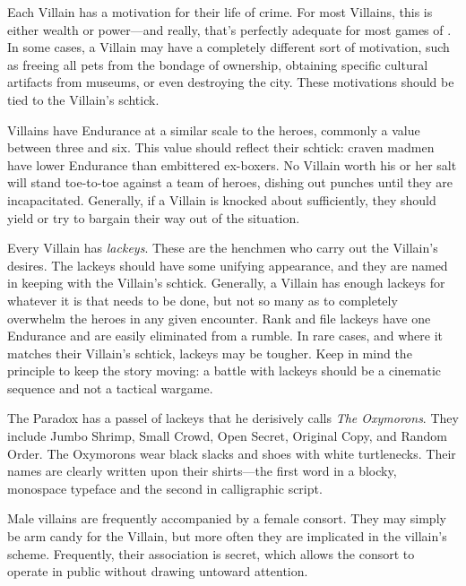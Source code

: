 \documentclass[letterpaper]{report}
\begin{document}
Each Villain has a motivation for their life of crime. For most
Villains, this is either wealth or power---and really, that's
perfectly adequate for most games of \kapow{}. In some cases, a
Villain may have a completely different sort of motivation, such as
freeing all pets from the bondage of ownership, obtaining specific
cultural artifacts from museums, or even destroying the city.  These
motivations should be tied to the Villain's schtick.

Villains have Endurance at a similar scale to the heroes,
commonly a value between three and six.
This value should reflect their schtick: craven madmen have lower
Endurance than embittered ex-boxers.
No Villain worth his or her salt will stand toe-to-toe against a team
of heroes, dishing out punches until they are incapacitated.
Generally, if a Villain is knocked about sufficiently, they should
yield or try to bargain their way out of the situation.

Every Villain has \emph{lackeys}. These are the henchmen who carry out
the Villain's desires. The lackeys should have some unifying
appearance, and they are named in keeping with the Villain's schtick.
Generally, a Villain has enough lackeys for whatever it is that needs
to be done, but not so many as to completely overwhelm the heroes in
any given encounter.  Rank and file lackeys have one Endurance and are
easily eliminated from a rumble. In rare cases, and where it matches
their Villain's schtick, lackeys may be tougher. Keep in mind the
principle to keep the story moving: a battle with lackeys should be a
cinematic sequence and not a tactical wargame.

\begin{example}
The Paradox has a passel of lackeys that he derisively calls
\textit{The Oxymorons}. They include
Jumbo Shrimp,
Small Crowd,
Open Secret,
Original Copy,
and
Random Order.
The Oxymorons wear black slacks and shoes with white turtlenecks.
Their names are clearly written upon their shirts---the first word in a blocky,
monospace typeface and the second in calligraphic script.
\end{example}

Male villains are frequently accompanied by a female consort.
They may simply be arm candy for the Villain, but more often they are
implicated in the villain's scheme. Frequently, their association is secret,
which allows the consort to operate in public without drawing untoward
attention.
\end{document}
